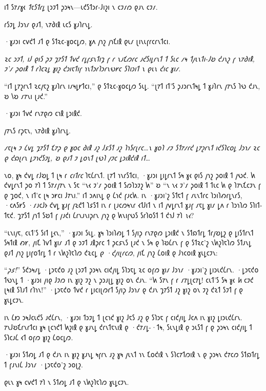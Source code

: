𐑦𐑑 𐑕𐑳𐑥𐑣𐑬 \emph{𐑑𐑱𐑕𐑑𐑩𐑛} 𐑚𐑮𐑲𐑑 𐑜𐑮𐑰𐑯—𐑧𐑒𐑕𐑑𐑮𐑩-𐑓𐑦𐑟𐑦 𐑯 𐑤𐑲𐑥𐑼 𐑞𐑨𐑯 𐑤𐑲𐑥.

𐑩𐑕𐑲𐑛 𐑓𐑮𐑪𐑥 𐑞𐑨𐑑, 𐑯𐑳𐑔𐑦𐑙 𐑧𐑤𐑕 𐑣𐑨𐑐𐑩𐑯𐑛.

·𐑣𐑨𐑮𐑦 𐑤𐑫𐑒𐑑 𐑨𐑑 𐑞 𐑕𐑑𐑷𐑤-𐑣𐑴𐑤𐑛𐑼, 𐑣𐑵 𐑢𐑪𐑟 𐑢𐑪𐑗𐑦𐑙 𐑞𐑧𐑥 𐑚𐑦𐑯𐑧𐑝𐑩𐑤𐑩𐑯𐑑𐑤𐑦.

\emph{𐑷𐑤 𐑮𐑲𐑑, 𐑦𐑓 𐑞𐑦𐑕 𐑜𐑲 𐑡𐑳𐑕𐑑 𐑑𐑫𐑒 𐑩𐑛𐑝𐑭𐑯𐑑𐑦𐑡 𐑝 𐑩 𐑯𐑨𐑗𐑼𐑩𐑤 𐑨𐑒𐑕𐑦𐑛𐑩𐑯𐑑 𐑑 𐑕𐑧𐑤 𐑥𐑰 𐑑𐑢𐑧𐑯𐑑𐑦-𐑓𐑹 𐑒𐑨𐑯𐑟 𐑝 𐑯𐑳𐑔𐑦𐑙, 𐑲'𐑥 𐑜𐑴𐑦𐑙 𐑑 𐑩𐑐𐑤𐑷𐑛 𐑣𐑦𐑟 𐑒𐑮𐑦𐑱𐑑𐑦𐑝 𐑪𐑯𐑑𐑮𐑩𐑐𐑮𐑩𐑯𐑻𐑾𐑤 𐑕𐑐𐑦𐑮𐑦𐑑 𐑯 𐑞𐑧𐑯 𐑒𐑦𐑤 𐑣𐑦𐑥.}

“𐑦𐑑 𐑛𐑳𐑟𐑩𐑯𐑑 𐑷𐑤𐑢𐑱𐑟 𐑣𐑨𐑐𐑩𐑯 𐑦𐑥𐑰𐑛𐑾𐑑𐑤𐑦,” 𐑞 𐑕𐑑𐑷𐑤-𐑣𐑴𐑤𐑛𐑼 𐑕𐑧𐑛. “𐑚𐑳𐑑 𐑦𐑑'𐑕 𐑜𐑨𐑮𐑩𐑯𐑑𐑰𐑛 𐑑 𐑣𐑨𐑐𐑩𐑯 𐑢𐑳𐑯𐑕 𐑐𐑻 𐑒𐑨𐑯, 𐑹 𐑘𐑹 𐑥𐑳𐑯𐑦 𐑚𐑨𐑒.”

·𐑣𐑨𐑮𐑦 𐑑𐑫𐑒 𐑩𐑯𐑳𐑞𐑼 𐑤𐑪𐑙 𐑛𐑮𐑦𐑙𐑒.

𐑢𐑳𐑯𐑕 𐑩𐑜𐑱𐑯, 𐑯𐑳𐑔𐑦𐑙 𐑣𐑨𐑐𐑩𐑯𐑛.

\emph{𐑥𐑱𐑚𐑰 𐑲 𐑖𐑫𐑛 𐑡𐑳𐑕𐑑 𐑗𐑳𐑜 𐑞 𐑣𐑴𐑤 𐑔𐑦𐑙 𐑨𐑟 𐑓𐑭𐑕𐑑 𐑨𐑟 𐑐𐑪𐑕𐑩𐑚𐑩𐑤…𐑯 𐑣𐑴𐑐 𐑥𐑲 𐑕𐑑𐑳𐑥𐑩𐑒 𐑛𐑳𐑟𐑩𐑯𐑑 𐑦𐑒𐑕𐑐𐑤𐑴𐑛 𐑓𐑮𐑪𐑥 𐑷𐑤 𐑞 𐑒𐑸𐑚𐑩𐑯 𐑛𐑲𐑪𐑒𐑕𐑲𐑛, 𐑹 𐑞𐑨𐑑 𐑲 𐑛𐑴𐑯𐑑 𐑚𐑻𐑐 𐑢𐑲𐑤 𐑛𐑮𐑦𐑙𐑒𐑦𐑙 𐑦𐑑…}

𐑯𐑴, 𐑣𐑰 𐑒𐑫𐑛 𐑩𐑓𐑹𐑛 𐑑 𐑚𐑰 𐑩 \emph{𐑤𐑦𐑑𐑩𐑤} 𐑐𐑱𐑖𐑩𐑯𐑑. 𐑚𐑳𐑑 𐑪𐑯𐑩𐑕𐑑𐑤𐑦, ·𐑣𐑨𐑮𐑦 𐑛𐑦𐑛𐑩𐑯𐑑 𐑕𐑰 𐑣𐑬 𐑞𐑦𐑕 𐑢𐑪𐑟 𐑜𐑴𐑦𐑙 𐑑 𐑢𐑻𐑒. 𐑿 𐑒𐑫𐑛𐑩𐑯𐑑 𐑜𐑴 𐑳𐑐 𐑑 𐑕𐑳𐑥𐑢𐑳𐑯 𐑯 𐑕𐑱 “𐑯𐑬 𐑲'𐑥 𐑜𐑴𐑦𐑙 𐑑 𐑕𐑼𐑐𐑮𐑲𐑟 𐑿” 𐑹 “𐑯 𐑯𐑬 𐑲'𐑥 𐑜𐑴𐑦𐑙 𐑑 𐑑𐑧𐑤 𐑿 𐑞 𐑐𐑳𐑯𐑗𐑤𐑲𐑯 𐑝 𐑞 𐑡𐑴𐑒, 𐑯 𐑦𐑑'𐑤 𐑚𐑰 𐑮𐑾𐑤𐑦 𐑓𐑳𐑯𐑦.” 𐑦𐑑 𐑮𐑵𐑦𐑯𐑛 𐑞 𐑖𐑪𐑒 𐑝𐑨𐑤𐑿. 𐑦𐑯 ·𐑣𐑨𐑮𐑦'𐑟 𐑕𐑑𐑱𐑑 𐑝 𐑥𐑧𐑯𐑑𐑩𐑤 𐑐𐑮𐑦𐑐𐑺𐑩𐑛𐑯𐑩𐑕, ·𐑤𐑵𐑕𐑾𐑕 ·𐑥𐑨𐑤𐑓𐑶 𐑒𐑫𐑛 𐑣𐑨𐑝 𐑢𐑷𐑒𐑑 𐑐𐑭𐑕𐑑 𐑦𐑯 𐑩 𐑚𐑨𐑤𐑼𐑰𐑯𐑩 𐑬𐑑𐑓𐑦𐑑 𐑯 𐑦𐑑 𐑢𐑫𐑛𐑩𐑯𐑑 𐑣𐑨𐑝 𐑥𐑱𐑛 𐑣𐑦𐑥 𐑛𐑵 𐑩 𐑐𐑮𐑪𐑐𐑼 𐑕𐑐𐑦𐑑-𐑑𐑱𐑒. 𐑡𐑳𐑕𐑑 𐑢𐑪𐑑 𐑕𐑹𐑑 𐑝 𐑢𐑨𐑒𐑦 𐑖𐑩𐑯𐑨𐑯𐑦𐑜𐑩𐑯 𐑢𐑪𐑟 𐑞 𐑿𐑯𐑦𐑝𐑻𐑕 𐑕𐑩𐑐𐑴𐑕𐑑 𐑑 𐑒𐑪𐑓 𐑳𐑐 \emph{𐑯𐑬}?

“𐑧𐑯𐑦𐑢𐑱, 𐑤𐑧𐑑'𐑕 𐑕𐑦𐑑 𐑛𐑬𐑯,” ·𐑣𐑨𐑮𐑦 𐑕𐑧𐑛. 𐑣𐑰 𐑐𐑮𐑦𐑐𐑺𐑛 𐑑 𐑕𐑢𐑦𐑜 𐑩𐑯𐑳𐑞𐑼 𐑛𐑮𐑦𐑙𐑒 𐑯 𐑕𐑑𐑸𐑑𐑩𐑛 𐑑𐑩𐑢𐑹𐑛𐑟 𐑞 𐑛𐑦𐑕𐑑𐑩𐑯𐑑 𐑕𐑰𐑑𐑦𐑙 𐑺𐑾, 𐑢𐑦𐑗 𐑐𐑫𐑑 𐑣𐑦𐑥 𐑨𐑑 𐑞 𐑮𐑲𐑑 𐑨𐑙𐑜𐑩𐑤 𐑑 𐑜𐑤𐑭𐑯𐑕 𐑚𐑨𐑒 𐑯 𐑕𐑰 𐑞 𐑐𐑹𐑖𐑩𐑯 𐑝 𐑞 𐑕𐑑𐑷𐑤'𐑟 𐑯𐑿𐑟𐑐𐑱𐑐𐑼 𐑕𐑑𐑨𐑯𐑛 𐑞𐑨𐑑 𐑢𐑪𐑟 𐑛𐑦𐑝𐑴𐑑𐑩𐑛 𐑑 𐑩 𐑯𐑿𐑟𐑐𐑱𐑐𐑼 𐑒𐑷𐑤𐑛 \emph{𐑞 ·𐑒𐑢𐑦𐑚𐑩𐑤𐑼}, 𐑢𐑦𐑗 𐑢𐑪𐑟 𐑖𐑴𐑦𐑙 𐑞 𐑓𐑪𐑤𐑴𐑦𐑙 𐑣𐑧𐑛𐑤𐑲𐑯:


“\emph{𐑜𐑭!}” 𐑕𐑒𐑮𐑰𐑥𐑛 ·𐑛𐑮𐑱𐑒𐑴 𐑨𐑟 𐑚𐑮𐑲𐑑 𐑜𐑮𐑰𐑯 𐑤𐑦𐑒𐑢𐑦𐑛 𐑕𐑐𐑮𐑱𐑛 𐑷𐑤 𐑴𐑝𐑼 𐑣𐑦𐑥 𐑓𐑮𐑪𐑥 ·𐑣𐑨𐑮𐑦'𐑟 𐑛𐑦𐑮𐑧𐑒𐑖𐑩𐑯. ·𐑛𐑮𐑱𐑒𐑴 𐑑𐑻𐑯𐑛 𐑑 ·𐑣𐑨𐑮𐑦 𐑢𐑦𐑞 𐑓𐑲𐑼 𐑦𐑯 𐑣𐑦𐑟 𐑲𐑟 𐑯 𐑜𐑮𐑨𐑚𐑛 𐑣𐑦𐑟 𐑴𐑯 𐑒𐑨𐑯. “𐑿 𐑕𐑳𐑯 𐑝 𐑩 𐑥𐑳𐑛𐑚𐑤𐑳𐑛! 𐑤𐑧𐑑'𐑕 𐑕𐑰 𐑣𐑬 \emph{𐑿} 𐑤𐑲𐑒 𐑚𐑰𐑦𐑙 𐑕𐑐𐑨𐑑 𐑩𐑐𐑪𐑯!” ·𐑛𐑮𐑱𐑒𐑴 𐑑𐑫𐑒 𐑩 𐑛𐑦𐑤𐑦𐑚𐑼𐑩𐑑 𐑕𐑢𐑦𐑜 𐑓𐑮𐑪𐑥 𐑞 𐑒𐑨𐑯 𐑡𐑳𐑕𐑑 𐑨𐑟 𐑣𐑦𐑟 𐑴𐑯 𐑲𐑟 𐑒𐑷𐑑 𐑕𐑲𐑑 𐑝 𐑞 𐑣𐑧𐑛𐑤𐑲𐑯.

𐑦𐑯 𐑖𐑽 𐑮𐑰𐑓𐑤𐑧𐑒𐑕 𐑨𐑒𐑖𐑩𐑯, ·𐑣𐑨𐑮𐑦 𐑑𐑮𐑲𐑛 𐑑 𐑚𐑤𐑪𐑒 𐑣𐑦𐑟 𐑓𐑱𐑕 𐑨𐑟 𐑞 𐑕𐑐𐑮𐑱 𐑝 𐑤𐑦𐑒𐑢𐑦𐑛 𐑓𐑤𐑵 𐑦𐑯 𐑣𐑦𐑟 𐑛𐑦𐑮𐑧𐑒𐑖𐑩𐑯. 𐑳𐑯𐑓𐑹𐑗𐑩𐑯𐑩𐑑𐑤𐑦 𐑣𐑰 𐑚𐑤𐑪𐑒𐑑 𐑿𐑟𐑦𐑙 𐑞 𐑣𐑨𐑯𐑛 𐑒𐑩𐑯𐑑𐑱𐑯𐑦𐑙 𐑞 ·𐑒𐑳𐑥𐑛-·𐑑𐑰, 𐑕𐑧𐑯𐑛𐑦𐑙 𐑞 𐑮𐑧𐑕𐑑 𐑝 𐑞 𐑜𐑮𐑰𐑯 𐑤𐑦𐑒𐑢𐑦𐑛 𐑑 𐑕𐑐𐑤𐑨𐑖 𐑬𐑑 𐑴𐑝𐑼 𐑣𐑦𐑟 𐑖𐑴𐑤𐑛𐑼.

·𐑣𐑨𐑮𐑦 𐑕𐑑𐑺𐑛 𐑨𐑑 𐑞 𐑒𐑨𐑯 𐑦𐑯 𐑣𐑦𐑟 𐑣𐑨𐑯𐑛 𐑰𐑝𐑩𐑯 𐑨𐑟 𐑣𐑰 𐑢𐑧𐑯𐑑 𐑪𐑯 𐑗𐑴𐑒𐑦𐑙 𐑯 𐑕𐑐𐑤𐑳𐑑𐑼𐑦𐑙 𐑯 𐑞 𐑜𐑮𐑰𐑯 𐑒𐑳𐑤𐑼 𐑕𐑑𐑸𐑑𐑩𐑛 𐑑 𐑝𐑨𐑯𐑦𐑖 𐑓𐑮𐑪𐑥 ·𐑛𐑮𐑱𐑒𐑴'𐑟 𐑮𐑴𐑚𐑟.

𐑞𐑧𐑯 𐑣𐑰 𐑤𐑫𐑒𐑑 𐑳𐑐 𐑯 𐑕𐑑𐑺𐑛 𐑨𐑑 𐑞 𐑯𐑿𐑟𐑐𐑱𐑐𐑼 𐑣𐑧𐑛𐑤𐑲𐑯.

